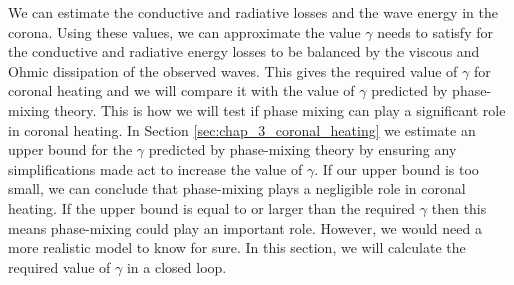 We can estimate the conductive and radiative losses \citep{Withbroe1977} and the wave energy \citep{McIntosh2011,McIntosh2012} in the corona. Using these values, we can approximate the value $\gamma$ needs to satisfy for the conductive and radiative energy losses to be balanced by the viscous and Ohmic dissipation of the observed waves. This gives the required value of $\gamma$ for coronal heating and we will compare it with the value of $\gamma$ predicted by phase-mixing theory. This is how we will test if phase mixing can play a significant role in coronal heating. In Section \ref{sec:chap_3_coronal_heating} we estimate an upper bound for the $\gamma$ predicted by phase-mixing theory by ensuring any simplifications made act to increase the value of $\gamma$. If our upper bound is too small, we can conclude that phase-mixing plays a negligible role in coronal heating. If the upper bound is equal to or larger than the required $\gamma$ then this means phase-mixing could play an important role. However, we would need a more realistic model to know for sure. In this section, we will calculate the required value of $\gamma$ in a closed loop. 

